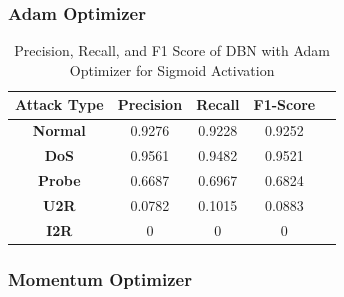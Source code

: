 \documentclass[12pt, a4paper]{report}
\begin{document}
\subsubsection{Adam Optimizer}
\begin{table}[ht]
\centering
\captionsetup{justification=centering,margin=2cm}
\begin{tabular}{|c|c|c|c|c|}
\hline
\multicolumn{1}{|c|}{\textbf{Attack Type}} & \multicolumn{1}{c|}{\textbf{Precision}} & \multicolumn{1}{c|}{\textbf{Recall}} & \multicolumn{1}{c|}{\textbf{F1-Score}} \\ \hline
\textbf{Normal}        & 0.9276                                  & 0.9228                               & 0.9252                                                                  \\ \hline
\textbf{DoS}           & 0.9561                                  & 0.9482                                &  0.9521                                                                   \\ \hline
\textbf{Probe}         & 0.6687                                  & 0.6967                                & 0.6824                                                                  \\ \hline
\textbf{U2R}           & 0.0782                                   & 0.1015                                & 0.0883                                                                     \\ \hline
\textbf{I2R}           & 0                                       & 0                                    & 0                                                                          \\ \hline
\end{tabular}
\caption{Precision, Recall, and F1 Score of DBN with Adam Optimizer for Sigmoid Activation}
\label{prf1_adam_dbn}
\end{table}

\subsubsection{Momentum Optimizer}
\end{document}
